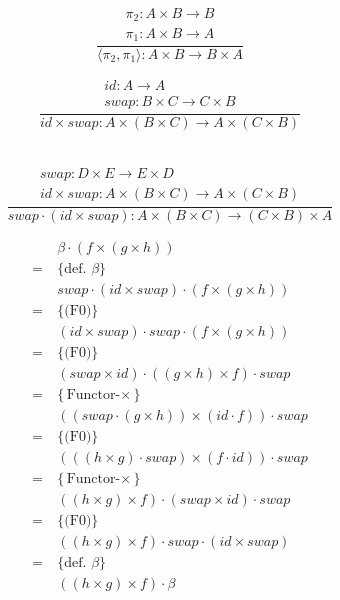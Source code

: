 \documentclass[a4paper,11pt]{article}
\begin{document}
	\begin{minipage}{0.45\textwidth}
		\[
		\frac{
			\begin{array}{c}
				\pi_2: A \times B \rightarrow B \\
				\pi_1: A \times B \rightarrow A
			\end{array}
		}{
			\langle \pi_2, \pi_1 \rangle : A \times B \rightarrow B \times A
		}
		\]
	\end{minipage}
	\hfill
	\begin{minipage}{0.45\textwidth}
		\[
		\frac{
			\begin{array}{c}
				id: A \rightarrow A \\
				swap: B \times C \rightarrow C \times B
			\end{array}
		}{
			id \times swap: A \times (B \times C) \rightarrow A \times (C \times B)
		}
		\]
	\end{minipage}
	\\
	
	\[
		\frac{
			\begin{array}{c}
				swap: D \times E \rightarrow E \times D \\
				id \times swap: A \times (B \times C) \rightarrow A \times (C \times B)
			\end{array}
		}{
			swap \cdot (id \times swap): A \times (B \times C) \rightarrow (C \times B) \times A
		}
	\]
	
	\newpage
	
	\[
	\begin{aligned}
		&\beta\cdot (f \times (g \times h)) \\
		= \  &\{\text{def. $\beta$}\}\\
		& swap \cdot (id \times swap) \cdot (f \times (g \times h)) \\
		= \  &\{\text{(F0)}\}\\
		& (id \times swap) \cdot swap \cdot (f \times (g \times h)) \\
		= \  &\{\text{(F0)}\}\\
		& (swap \times id) \cdot ((g \times h) \times f) \cdot swap \\
		= \  &\{\text{Functor-$\times$}\}\\
		& ((swap \cdot (g \times h)) \times (id \cdot f)) \cdot swap\\
		= \  &\{\text{(F0)}\}\\
		& (((h \times g) \cdot swap) \times (f \cdot id)) \cdot swap \\
		= \  &\{\text{Functor-$\times$}\}\\
		& ((h \times g) \times f) \cdot (swap \times id) \cdot swap \\
		= \  &\{\text{(F0)}\}\\
		& ((h \times g) \times f) \cdot swap \cdot (id \times swap) \\
		= \  &\{\text{def. $\beta$}\}\\
		& ((h \times g) \times f) \cdot \beta
	\end{aligned}
	\]
	
\end{document}
